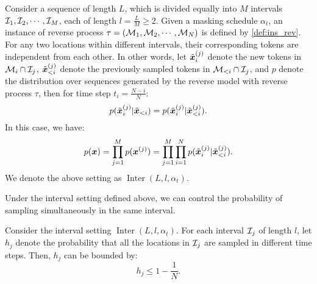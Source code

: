 \begin{definition}
\label{def:interval_setting}
Consider a sequence of length $L$, which is divided equally into $M$ intervals ${\mathcal{I}}_1,{\mathcal{I}}_2,\cdots,{\mathcal{I}}_M$, each of length $l=\frac{L}{M}\geq 2$. Given a masking schedule $\alpha_t$, an instance of reverse process $\tau=({\mathcal{M}}_1,{\mathcal{M}}_2,\cdots,{\mathcal{M}}_N)$ is defined by \cref{def:ins_rev}. For any two locations within different intervals, their corresponding tokens are independent from each other. In other words, let $\Tilde{{\bm{x}}}_i^{(j)}$ denote the new tokens in ${\mathcal{M}}_i\cap{\mathcal{I}}_j$, $\Tilde{{\bm{x}}}_{<i}^{(j)}$ denote the previously sampled tokens in ${\mathcal{M}}_{<i}\cap{\mathcal{I}}_j$, and $p$ denote the distribution over sequences generated by the reverse model with reverse process $\tau$, then for time step $t_i=\frac{N-i}{N}$:
$$p(\Tilde{{\bm{x}}}_i^{(j)}|\Tilde{{\bm{x}}}_{<i})=p(\Tilde{{\bm{x}}}_i^{(j)}|\Tilde{{\bm{x}}}_{<i}^{(j)}).$$
In this case, we have:
$$p({\bm{x}})=\prod_{j=1}^{M}p({\bm{x}}^{(j)})=\prod_{j=1}^{M}\prod_{i=1}^{N}p(\Tilde{{\bm{x}}}_i^{(j)}|\Tilde{{\bm{x}}}_{<i}^{(j)}).$$
We denote the above setting as $\operatorname{Inter}(L,l,\alpha_t)$.
\end{definition}



Under the interval setting defined above, we can control the probability of sampling simultaneously in the same interval.

\begin{lemma}
\label{lemma:simul_prob_inter}
    Consider the interval setting $\operatorname{Inter}(L,l,\alpha_t)$. For each interval ${\mathcal{I}}_j$ of length $l$, let $h_j$ denote the probability that all the locations in ${\mathcal{I}}_j$ are sampled in different time steps. Then, 
    $h_j$ can be bounded by:
    $$h_j\leq 1-\frac{1}{N}.$$
\end{lemma}

